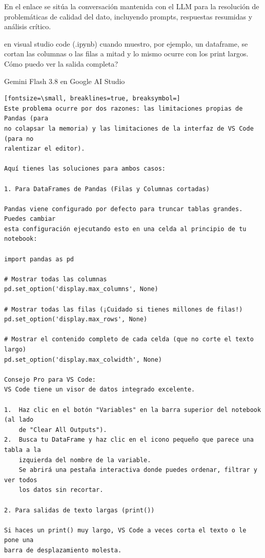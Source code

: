 \documentclass[12pt,a4paper,oneside]{book}
\begin{document}
\begin{iaanalisis}
En el enlace se sitúa la conversación mantenida con el LLM para la resolución de problemáticas de calidad del dato, incluyendo prompts, respuestas resumidas y análisis crítico.
\end{iaanalisis}


\begin{iaprompt}
en visual studio code (.ipynb) cuando muestro, por ejemplo, un dataframe, se
cortan las columnas o las filas a mitad y lo mismo ocurre con los print largos.
Cómo puedo ver la salida completa?
\end{iaprompt}
\begin{iaresp}{Gemini Flash 3.8 en Google AI Studio}
\begin{Verbatim}[fontsize=\small, breaklines=true, breaksymbol=]
Este problema ocurre por dos razones: las limitaciones propias de Pandas (para
no colapsar la memoria) y las limitaciones de la interfaz de VS Code (para no
ralentizar el editor).

Aquí tienes las soluciones para ambos casos:

1. Para DataFrames de Pandas (Filas y Columnas cortadas)

Pandas viene configurado por defecto para truncar tablas grandes. Puedes cambiar
esta configuración ejecutando esto en una celda al principio de tu notebook:

import pandas as pd

# Mostrar todas las columnas
pd.set_option('display.max_columns', None)

# Mostrar todas las filas (¡Cuidado si tienes millones de filas!)
pd.set_option('display.max_rows', None)

# Mostrar el contenido completo de cada celda (que no corte el texto largo)
pd.set_option('display.max_colwidth', None)

Consejo Pro para VS Code:
VS Code tiene un visor de datos integrado excelente.

1.  Haz clic en el botón "Variables" en la barra superior del notebook (al lado
    de "Clear All Outputs").
2.  Busca tu DataFrame y haz clic en el icono pequeño que parece una tabla a la
    izquierda del nombre de la variable.
    Se abrirá una pestaña interactiva donde puedes ordenar, filtrar y ver todos
    los datos sin recortar.

2. Para salidas de texto largas (print())

Si haces un print() muy largo, VS Code a veces corta el texto o le pone una
barra de desplazamiento molesta.


\end{Verbatim}
\end{iaresp}
\end{document}
